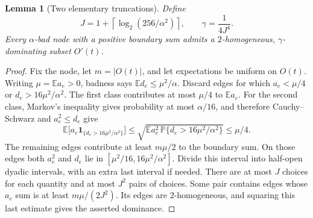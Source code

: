 \documentclass[11pt]{amsart}
\newtheorem{lemma}[theorem]{Lemma}
\theoremstyle{definition}
\theoremstyle{remark}
\numberwithin{equation}{section}
\begin{document}
\begin{lemma}[Two elementary truncations]\label{hb:bucketing}
Define
\[
 J=1+\left\lceil\log_2(256/\alpha^2)\right\rceil,
 \qquad \gamma=\frac1{4J^4}.
\]
Every $\alpha$-bad node with a positive boundary sum admits a
$2$-homogeneous, $\gamma$-dominating subset $O'(t)$.
\end{lemma}
\begin{proof}
Fix the node, let $m=|O(t)|$, and let expectations be uniform on $O(t)$.
Writing $\mu=\mathbb E a_e>0$, badness says
$\mathbb E d_e\le\mu^2/\alpha$.  Discard edges for which
$a_e<\mu/4$ or $d_e>16\mu^2/\alpha^2$.  The first class contributes
at most $\mu/4$ to $\mathbb E a_e$.  For the second class, Markov's
inequality gives probability at most $\alpha/16$, and therefore
Cauchy--Schwarz and $a_e^2\le d_e$ give
\[
 \mathbb E\bigl[a_e\mathbf1_{\{d_e>16\mu^2/\alpha^2\}}\bigr]
 \le\sqrt{\mathbb E a_e^2\,
          \mathbb P\{d_e>16\mu^2/\alpha^2\}}
 \le\mu/4.
\]
The remaining edges contribute at least $m\mu/2$ to the boundary sum.
On those edges both $a_e^2$ and $d_e$ lie in
$[\mu^2/16,16\mu^2/\alpha^2]$.  Divide this interval into half-open
dyadic intervals, with an extra last interval if needed.  There are
at most $J$ choices for each quantity and at most $J^2$ pairs of
choices.  Some pair contains edges whose $a_e$ sum is at least
$m\mu/(2J^2)$.  Its edges are $2$-homogeneous, and squaring this
last estimate gives the asserted dominance.
\end{proof}
\end{document}
